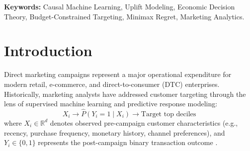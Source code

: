 \documentclass[11pt,a4paper]{article}
\begin{document}
\begin{abstract}
Empirical results reveal: (1) customer rankings produced by conventional response models diverge sharply from causal uplift models, exhibiting a Spearman rank correlation of only $\rho = 0.3817$ and merely $43.5\%$ cohort overlap within the top decile, confirming that response models misallocate over half their budget to non-incremental buyers; (2) at a $20\%$ campaign coverage constraint, the causal uplift policy generates $\$0.3934$ in net economic value per customer compared to $\$0.2908$ under response modeling---a $+35.3\%$ net profit expansion; (3) across uncertain economic scenarios, the proposed minimax regret policy compresses maximum financial regret by $61.1\%$ (from $\$0.3554$ to $\$0.1384$) relative to response targeting; (4) in multi-arm campaign allocation (Men's vs. Women's email vs. Control), uniform deployment of the globally superior creative outperforms individual algorithmic personalization ($\$0.3575$ vs. $\$0.2615$) due to ``opportunity cost drag''; and (5) large-scale digital display advertising (Criteo) exhibits high response-uplift concordance ($\rho = 0.8044$, $85.2\%$ overlap), establishing a fundamental domain boundary condition between high-intent direct channels and low-baseline programmatic display advertising.
\end{abstract}

\noindent \textbf{Keywords:} Causal Machine Learning, Uplift Modeling, Economic Decision Theory, Budget-Constrained Targeting, Minimax Regret, Marketing Analytics.

\newpage

\section{Introduction}

Direct marketing campaigns represent a major operational expenditure for modern retail, e-commerce, and direct-to-consumer (DTC) enterprises. Historically, marketing analysts have addressed customer targeting through the lens of supervised machine learning and predictive response modeling:
\begin{equation}
X_i \longrightarrow \widehat{P}(Y_i=1 \mid X_i) \longrightarrow \text{Target top deciles}
\end{equation}
where $X_i \in \mathbb{R}^d$ denotes observed pre-campaign customer characteristics (e.g., recency, purchase frequency, monetary history, channel preferences), and $Y_i \in \{0, 1\}$ represents the post-campaign binary transaction outcome \citep{blattberg2008database}. 
\end{document}
